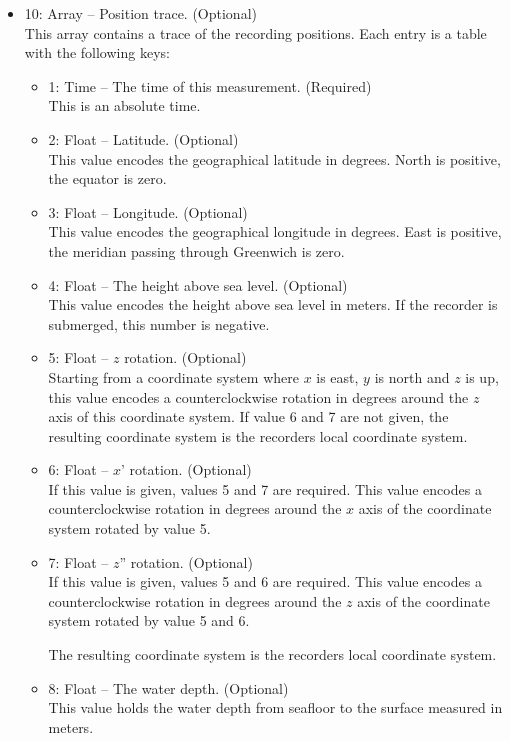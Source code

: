\documentclass[DIV=10]{scrartcl}
\begin{document}
\begin{itemize}
  \item 10: Array – Position trace. (Optional)\\
  This array contains a trace of the recording positions.
  Each entry is a table with the following keys:
  \begin{itemize}
    \item 1: Time – The time of this measurement. (Required)\\
    This is an absolute time.
    \item 2: Float – Latitude. (Optional)\\
    This value encodes the geographical latitude in degrees.
    North is positive, the equator is zero.
    \item 3: Float – Longitude. (Optional)\\
    This value encodes the geographical longitude in degrees.
    East is positive, the meridian passing through Greenwich is zero.
    \item 4: Float – The height above sea level. (Optional)\\
    This value encodes the height above sea level in meters.
    If the recorder is submerged, this number is negative.
    \item 5: Float – \(z\) rotation. (Optional)\\
    Starting from a coordinate system where \(x\) is east, \(y\) is north and \(z\) is up, this value encodes a counterclockwise rotation in degrees around the \(z\) axis of this coordinate system.
    If value 6 and 7 are not given, the resulting coordinate system is the recorders local coordinate system.
    \item 6: Float – \(x\)’ rotation. (Optional)\\
    If this value is given, values 5 and 7 are required.
    This value encodes a counterclockwise rotation in degrees around the \(x\) axis of the coordinate system rotated by value 5.
    \item 7: Float – \(z\)” rotation. (Optional)\\
    If this value is given, values 5 and 6 are required.
    This value encodes a counterclockwise rotation in degrees around the \(z\) axis of the coordinate system rotated by value 5 and 6.

    The resulting coordinate system is the recorders local coordinate system.
    \item 8: Float – The water depth. (Optional)\\
    This value holds the water depth from seafloor to the surface measured in meters.
  \end{itemize}


\end{itemize}
\end{document}

